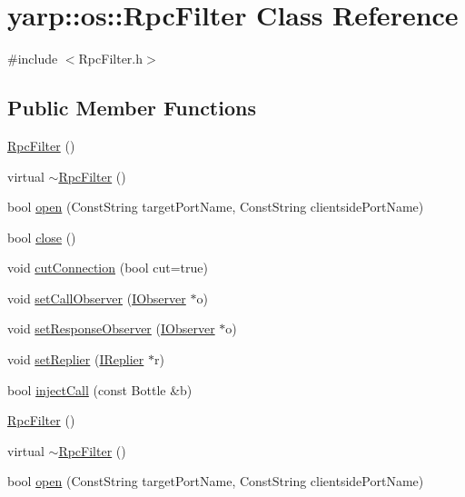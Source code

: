 \hypertarget{classyarp_1_1os_1_1_rpc_filter}{
\section{yarp::os::RpcFilter Class Reference}
\label{classyarp_1_1os_1_1_rpc_filter}
}


{\ttfamily \#include $<$RpcFilter.h$>$}\subsection*{Public Member Functions}
\begin{DoxyCompactItemize}
\item 
\hyperlink{classyarp_1_1os_1_1_rpc_filter_a6be8523a6258d84266a57734c907b70c}{RpcFilter} ()
\item 
virtual \hyperlink{classyarp_1_1os_1_1_rpc_filter_abcf7b927eb6c44e70087d44e72a9da52}{$\sim$RpcFilter} ()
\item 
bool \hyperlink{classyarp_1_1os_1_1_rpc_filter_adeb2b65f313a9ef7986244d81fdab354}{open} (ConstString targetPortName, ConstString clientsidePortName)
\item 
bool \hyperlink{classyarp_1_1os_1_1_rpc_filter_a7c3fd3737767ad8ae8730e44e96d1f20}{close} ()
\item 
void \hyperlink{classyarp_1_1os_1_1_rpc_filter_ae7a72f77f502c0872a3efb87cffb17e4}{cutConnection} (bool cut=true)
\item 
void \hyperlink{classyarp_1_1os_1_1_rpc_filter_a36f86ee737cfff2cb29b8b0187bffe84}{setCallObserver} (\hyperlink{classyarp_1_1os_1_1_i_observer}{IObserver} $\ast$o)
\item 
void \hyperlink{classyarp_1_1os_1_1_rpc_filter_a9842c9621ae44b7f09e7faf33277dc05}{setResponseObserver} (\hyperlink{classyarp_1_1os_1_1_i_observer}{IObserver} $\ast$o)
\item 
void \hyperlink{classyarp_1_1os_1_1_rpc_filter_a266cce1c8c9088b26ad7d6c65fc2201f}{setReplier} (\hyperlink{classyarp_1_1os_1_1_i_replier}{IReplier} $\ast$r)
\item 
bool \hyperlink{classyarp_1_1os_1_1_rpc_filter_a18789775d8040efabf1bc8df5d0f1c86}{injectCall} (const Bottle \&b)
\item 
\hyperlink{classyarp_1_1os_1_1_rpc_filter_aff16f065e6f387df20b2055f50b3b4df}{RpcFilter} ()
\item 
virtual \hyperlink{classyarp_1_1os_1_1_rpc_filter_a522b392967835a22401e65f7d3379869}{$\sim$RpcFilter} ()
\item 
bool \hyperlink{classyarp_1_1os_1_1_rpc_filter_a5e5998e39055ac1d5fd9556e2a784478}{open} (ConstString targetPortName, ConstString clientsidePortName)

\end{DoxyCompactItemize}
